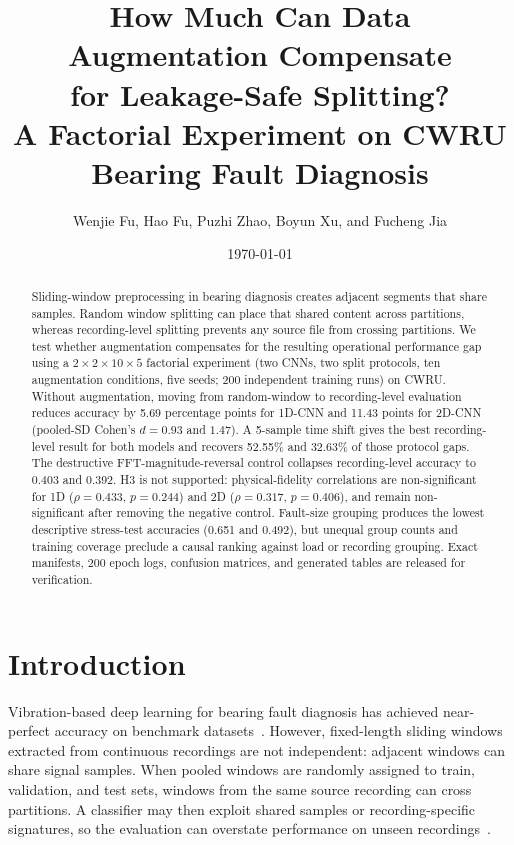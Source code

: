 ﻿\documentclass[11pt,a4paper]{article}
\title{\textbf{How Much Can Data Augmentation Compensate\\for Leakage-Safe Splitting?}\\[4pt]
\large A Factorial Experiment on CWRU Bearing Fault Diagnosis}
\author{Wenjie Fu, Hao Fu, Puzhi Zhao, Boyun Xu, and Fucheng Jia}
\date{\today}
\begin{document}
\maketitle

\begin{abstract}
Sliding-window preprocessing in bearing diagnosis creates adjacent segments that share samples. Random window splitting can place that shared content across partitions, whereas recording-level splitting prevents any source file from crossing partitions. We test whether augmentation compensates for the resulting operational performance gap using a $2\times2\times10\times5$ factorial experiment (two CNNs, two split protocols, ten augmentation conditions, five seeds; 200 independent training runs) on CWRU. Without augmentation, moving from random-window to recording-level evaluation reduces accuracy by 5.69 percentage points for 1D-CNN and 11.43 points for 2D-CNN (pooled-SD Cohen's $d=0.93$ and $1.47$). A 5-sample time shift gives the best recording-level result for both models and recovers 52.55\% and 32.63\% of those protocol gaps. The destructive FFT-magnitude-reversal control collapses recording-level accuracy to 0.403 and 0.392. H3 is not supported: physical-fidelity correlations are non-significant for 1D ($\rho=0.433$, $p=0.244$) and 2D ($\rho=0.317$, $p=0.406$), and remain non-significant after removing the negative control. Fault-size grouping produces the lowest descriptive stress-test accuracies (0.651 and 0.492), but unequal group counts and training coverage preclude a causal ranking against load or recording grouping. Exact manifests, 200 epoch logs, confusion matrices, and generated tables are released for verification.
\end{abstract}

\section{Introduction}

Vibration-based deep learning for bearing fault diagnosis has achieved near-perfect accuracy on benchmark datasets~\cite{smith2015rolling,wen2018new,zhang2017new}. However, fixed-length sliding windows extracted from continuous recordings are not independent: adjacent windows can share signal samples. When pooled windows are randomly assigned to train, validation, and test sets, windows from the same source recording can cross partitions. A classifier may then exploit shared samples or recording-specific signatures, so the evaluation can overstate performance on unseen recordings~\cite{bergmeir2012use,cerqueira2020evaluating}.
\end{document}
